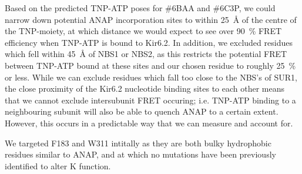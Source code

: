 Based on the predicted TNP-ATP poses for \#6BAA and \#6C3P, we could narrow down potential ANAP incorporation sites to within \SI{25}{\angstrom} of the centre of the TNP-moiety, at which distance we would expect to see over \SI{90}{\percent} FRET efficiency when TNP-ATP is bound to Kir6.2.
In addition, we excluded residues which fell within \SI{45}{\angstrom} of NBS1 or NBS2, as this restricts the potential FRET between TNP-ATP bound at these sites and our chosen residue to roughly \SI{25}{\percent} or less.
While we can exclude residues which fall too close to the NBS's of SUR1, the close proximity of the Kir6.2 nucleotide binding sites to each other means that we cannot exclude intersubunit FRET occuring; i.e. TNP-ATP binding to a neighbouring subunit will also be able to quench ANAP to a certain extent. However, this occurs in a predictable way that we can measure and account for.

We targeted F183 and W311 intitally as they are both bulky hydrophobic residues similar to ANAP, and at which no mutations have been previously identified to alter K\ATP{} function. 

